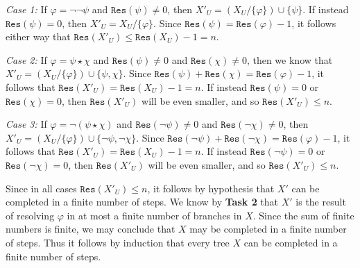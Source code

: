 \documentclass[a4paper, 11pt]{article} %
\newcommand{\set}[1]{\lbrace#1\rbrace} %
\newcommand{\even}{\texttt{Even}}
\newcommand{\res}{\texttt{Res}}
\begin{document}
\textit{Case 1:} 
If $\varphi=\neg\neg\psi$ and $\res(\psi)\neq 0$, then $X'_U=(X_U/\set{\varphi})\cup\set{\psi}$.
If instead $\res(\psi)=0$, then $X'_U=X_U/\set{\varphi}$.
Since $\res(\psi)=\res(\varphi)-1$, it follows either way that $\res(X'_U) \leq \res(X_U)-1=n$.

\textit{Case 2:} 
If $\varphi=\psi\star\chi$ and $\res(\psi)\neq 0$ and $\res(\chi)\neq 0$, then we know that $X'_U=(X_U/\set{\varphi})\cup\set{\psi,\chi}$.
Since $\res(\psi)+\res(\chi)=\res(\varphi)-1$, it follows that $\res(X'_U)=\res(X_U)-1=n$.
If instead $\res(\psi)=0$ or $\res(\chi)=0$, then $\res(X'_U)$ will be even smaller, and so $\res(X'_U)\leq n$.

\textit{Case 3:} 
If $\varphi=\neg(\psi\star\chi)$ and $\res(\neg\psi)\neq 0$ and $\res(\neg\chi)\neq 0$, then $X'_U=(X_U/\set{\varphi})\cup\set{\neg\psi,\neg\chi}$.
Since $\res(\neg\psi)+\res(\neg\chi)=\res(\varphi)-1$, it follows that $\res(X'_U)=\res(X_U)-1=n$.
If instead $\res(\neg\psi)=0$ or $\res(\neg\chi)=0$, then $\res(X'_U)$ will be even smaller, and so $\res(X'_U)\leq n$.

Since in all cases $\res(X'_U)\leq n$, it follows by hypothesis that $X'$ can be completed in a finite number of steps.
We know by \textbf{Task 2} that $X'$ is the result of resolving $\varphi$ in at most a finite number of branches in $X$.
Since the sum of finite numbers is finite, we may conclude that $X$ may be completed in a finite number of steps. 
Thus it follows by induction that every tree $X$ can be completed in a finite number of steps. 













\end{document}
